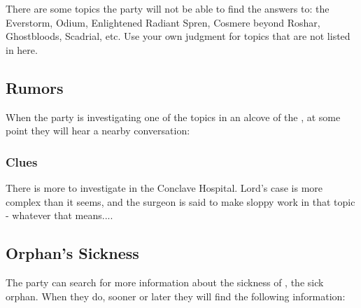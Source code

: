There are some topics the party will not be able to find the answers to: the Everstorm, Odium, Enlightened Radiant Spren, Cosmere beyond Roshar, Ghostbloods, Scadrial, etc. Use your own judgment for topics that are not listed in here.



\subsection{\locationPalanaeum{} Rumors}

When the party is investigating one of the topics in an alcove of the \locationPalanaeum{}, at some point they will hear  a nearby conversation:


\subsubsection{Clues}

There is more to investigate in the Conclave Hospital. Lord's \npcKharbranthNoble{} case is more complex than it seems, and the surgeon is said to make sloppy work in that topic - whatever that means....





\subsection{Orphan's Sickness}
\label{ssec:palanaeumOrphan}

The party can search for more information about the sickness of \npcOrphanSick{}, the sick orphan. When they do, sooner or later they will find the following information:


